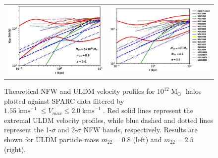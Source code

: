 \documentclass[a4paper,11pt]{article}
\begin{document}
\begin{figure}
\begin{tabular}{cc}
{\includegraphics[scale = 0.65, trim={2.5cm 2.5cm 2.1cm 0.5cm}]{pics/velocity.eps}} &
{\includegraphics[scale = 0.65, trim={2.1cm 2.5cm 0cm 0.5cm}]{pics/v_12_25_3_paper.eps}}
\end{tabular}
\caption{Theoretical NFW and ULDM velocity profiles for $10^{12}\operatorname{M}_{\odot}$ halos plotted against SPARC data filtered by $1.55 \operatorname{kms}^{-1}\leq V_{max}\leq 2.0 \operatorname{kms}^{-1}$. Red solid lines represent the extremal ULDM velocity profiles, while  blue dashed and dotted lines represent the 1-$\sigma$ and 2-$\sigma$ NFW bands, respectively. Results are shown for ULDM particle mass $m_{22} = 0.8$ (left) and $m_{22} = 2.5 $ (right).}\label{fig:velocity_12}
\end{figure}
\end{document}
